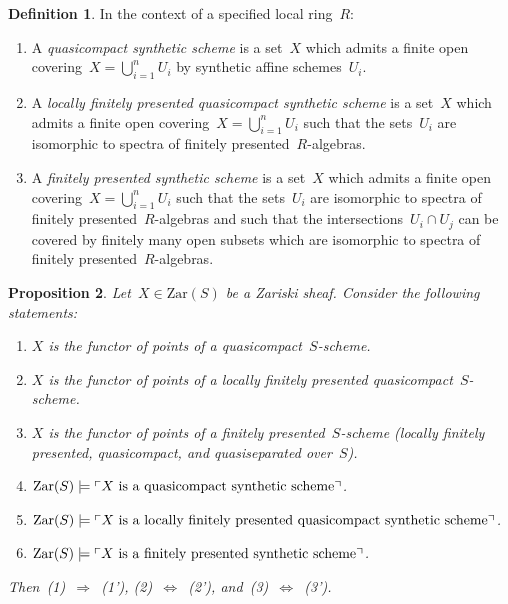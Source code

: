 \documentclass[10pt,reqno,a4paper]{amsbook}
\theoremstyle{definition}
\newtheorem{defn}{Definition}[section]
\theoremstyle{plain}
\newtheorem{prop}[defn]{Proposition}
\theoremstyle{remark}
\newcommand{\Zar}{\mathrm{Zar}}
\newcommand{\?}{\,{:}\,}
\renewcommand{\_}{\mathpunct{.}\,}
\newcommand{\speak}[1]{\ulcorner\text{\textnormal{#1}}\urcorner}
\begin{document}
\begin{defn}\label{defn:synthetic-scheme}
In the context of a specified local ring~$R$:
\begin{enumerate}
\item A \emph{quasicompact synthetic scheme} is a set~$X$ which admits a finite
open covering~$X = \bigcup_{i=1}^n U_i$ by synthetic affine schemes~$U_i$.
\item A \emph{locally finitely presented quasicompact synthetic scheme} is a
set~$X$ which admits a finite open covering~$X = \bigcup_{i=1}^n U_i$ such that
the sets~$U_i$ are isomorphic to spectra of finitely presented~$R$-algebras.
\item A \emph{finitely presented synthetic scheme} is a set~$X$ which admits a
finite open covering~$X = \bigcup_{i=1}^n U_i$ such that the sets~$U_i$ are
isomorphic to spectra of finitely presented~$R$-algebras and such that the
intersections~$U_i \cap U_j$ can be covered by finitely many open subsets which
are isomorphic to spectra of finitely presented~$R$-algebras.
\end{enumerate}
\end{defn}

\begin{prop}Let~$X \in \Zar(S)$ be a Zariski sheaf. Consider the following
statements:
\begin{enumerate}
\item $X$ is the functor of points of a quasicompact~$S$-scheme.
\item $X$ is the functor of points of a locally finitely presented quasicompact~$S$-scheme.
\item $X$ is the functor of points of a finitely presented~$S$-scheme (locally
finitely presented, quasicompact, and quasiseparated over~$S$).
\item[(1')] $\Zar(S) \models \speak{$X$ is a quasicompact synthetic scheme}$.
\item[(2')] $\Zar(S) \models \speak{$X$ is a locally finitely presented quasicompact synthetic scheme}$.
\item[(3')] $\Zar(S) \models \speak{$X$ is a finitely presented synthetic scheme}$.
\end{enumerate}
Then~(1)~$\Rightarrow$~(1'), (2)~$\Leftrightarrow$~(2'),
and~(3)~$\Leftrightarrow$~(3').
\end{prop}
\end{document}
